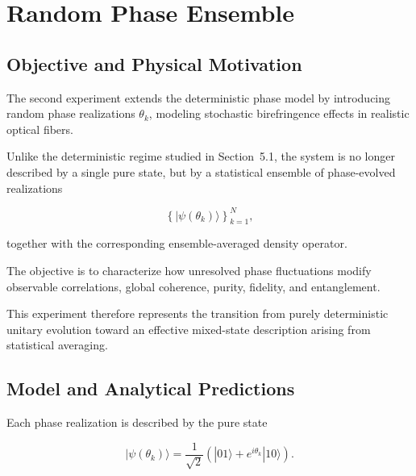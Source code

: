 
\section{Random Phase Ensemble}


\subsection{Objective and Physical Motivation}

The second experiment extends the deterministic phase model by introducing random phase realizations \( \theta_k \), modeling stochastic birefringence effects in realistic optical fibers.

Unlike the deterministic regime studied in Section~5.1, the system is no longer described by a single pure state, but by a statistical ensemble of phase-evolved realizations

\[
\left\{
|\psi(\theta_k)\rangle
\right\}_{k=1}^{N},
\]

together with the corresponding ensemble-averaged density operator.

The objective is to characterize how unresolved phase fluctuations modify observable correlations, global coherence, purity, fidelity, and entanglement.

This experiment therefore represents the transition from purely deterministic unitary evolution toward an effective mixed-state description arising from statistical averaging.


\subsection{Model and Analytical Predictions}

Each phase realization is described by the pure state

\begin{equation}
|\psi(\theta_k)\rangle
=
\frac{1}{\sqrt{2}}
\left(
|01\rangle + e^{i\theta_k}|10\rangle
\right).
\label{eq:random_phase_realization}
\end{equation}

